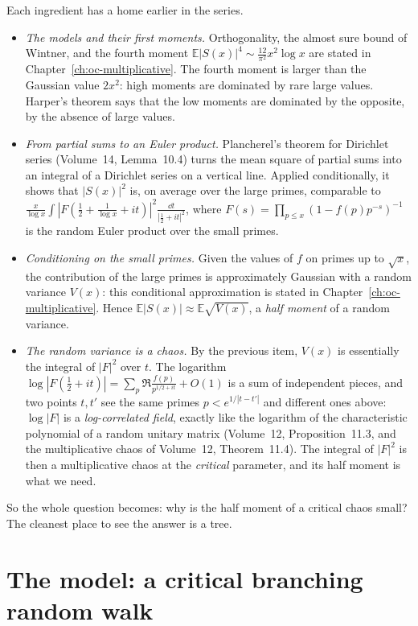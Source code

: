 Each ingredient has a home earlier in the series.
\begin{itemize}
\item \emph{The models and their first moments.} Orthogonality, the almost sure bound of Wintner, and the fourth moment $\mathbb E|S(x)|^4\sim\frac{12}{\pi^2}x^2\log x$ are stated in Chapter~\ref{ch:oc-multiplicative}. The fourth moment is larger than the Gaussian value $2x^2$: high moments are dominated by rare large values. Harper's theorem says that the low moments are dominated by the opposite, by the absence of large values.
\item \emph{From partial sums to an Euler product.} Plancherel's theorem for Dirichlet series (Volume~14, Lemma~10.4) turns the mean square of partial sums into an integral of a Dirichlet series on a vertical line. Applied conditionally, it shows that $|S(x)|^2$ is, on average over the large primes, comparable to $\frac x{\log x}\int|F(\frac12+\frac1{\log x}+it)|^2\frac{\dd t}{|\frac12+it|^2}$, where $F(s)=\prod_{p\le x}(1-f(p)p^{-s})^{-1}$ is the random Euler product over the small primes.
\item \emph{Conditioning on the small primes.} Given the values of $f$ on primes up to $\sqrt x$, the contribution of the large primes is approximately Gaussian with a random variance $V(x)$: this conditional approximation is stated in Chapter~\ref{ch:oc-multiplicative}. Hence $\mathbb E|S(x)|\approx\mathbb E\sqrt{V(x)}$, a \emph{half moment} of a random variance.
\item \emph{The random variance is a chaos.} By the previous item, $V(x)$ is essentially the integral of $|F|^2$ over $t$. The logarithm $\log|F(\frac12+it)|=\sum_p\Re\frac{f(p)}{p^{1/2+it}}+O(1)$ is a sum of independent pieces, and two points $t,t'$ see the same primes $p<e^{1/|t-t'|}$ and different ones above: $\log|F|$ is a \emph{log-correlated field}, exactly like the logarithm of the characteristic polynomial of a random unitary matrix (Volume~12, Proposition~11.3, and the multiplicative chaos of Volume~12, Theorem~11.4). The integral of $|F|^2$ is then a multiplicative chaos at the \emph{critical} parameter, and its half moment is what we need.
\end{itemize}

So the whole question becomes: why is the half moment of a critical chaos small? The cleanest place to see the answer is a tree.

\section{The model: a critical branching random walk}

